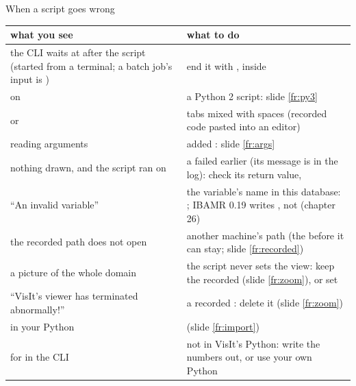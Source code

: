 \documentclass[aspectratio=169,11pt]{beamer}
\begin{document}
\begin{frame}{When a script goes wrong}
\label{fr:trouble}
\scriptsize
\begin{tabular}{@{}L{0.42\textwidth}L{0.53\textwidth}@{}}
\toprule
what you see & what to do \\
\midrule
the CLI waits at \code{>>>} after the script (started from a terminal; a batch job's input is ) & end it with , inside  \\
 on  & a Python 2 script: slide \ref{fr:py3} \\
 or  & tabs mixed with spaces (recorded code pasted into an editor) \\
 reading  arguments &  added : slide \ref{fr:args} \\
nothing drawn, and the script ran on & a failed  earlier (its message is in the log): check its return value,  \\
``An invalid variable'' & the variable's name in this database: ; IBAMR 0.19 writes , not  (chapter 26) \\
the recorded path does not open & another machine's path (the  before it can stay; slide \ref{fr:recorded}) \\
a picture of the whole domain & the script never sets the view: keep the recorded  (slide \ref{fr:zoom}), or set  \\
``VisIt's viewer has terminated abnormally!'' & a recorded : delete it (slide \ref{fr:zoom}) \\
 in your Python &  (slide \ref{fr:import}) \\
 for  in the CLI & not in VisIt's Python: write the numbers out, or use your own Python \\
\bottomrule
\end{tabular}
\end{frame}
\end{document}
